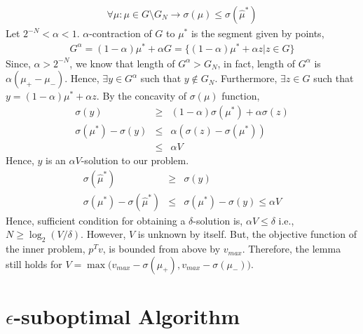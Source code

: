 \begin{eqnarray*}
\forall \mu: \mu \in G\setminus G_N \rightarrow \sigma(\mu) \leq \sigma(\hat{\mu}^*) 
\end{eqnarray*}
Let $2^{-N} < \alpha < 1$. $\alpha$-contraction of $G$ to $\mu^*$ is the segment given by points,
\begin{eqnarray*}
G^{\alpha} = (1 - \alpha)\mu^* + \alpha G = \big\{ (1-\alpha)\mu^* + \alpha z \big| z \in G \big\}
\end{eqnarray*}
Since, $\alpha > 2^{-N}$, we know that length of $G^{\alpha} > G_N$, in fact, length of $G^{\alpha}$ is $\alpha(\mu_+ - \mu_-)$. Hence, $\exists y \in G^{\alpha}$ such that $y \notin G_N$. Furthermore, $\exists z \in G$ such that $y = (1 - \alpha)\mu^* + \alpha z$. By the concavity of $\sigma(\mu)$ function,
\begin{eqnarray*}
\sigma(y) &\geq& (1 - \alpha)\sigma(\mu^*) + \alpha \sigma(z) \\
\sigma(\mu^*) - \sigma(y) &\leq& \alpha(\sigma(z) - \sigma(\mu^*)) \\
&\leq& \alpha V 
\end{eqnarray*}
Hence, $y$ is an $\alpha V$-solution to our problem.
\begin{eqnarray*}
\sigma(\hat{\mu}^*) &\geq& \sigma(y) \\
\sigma(\mu^*) - \sigma(\hat{\mu}^*) &\leq& \sigma(\mu^*) - \sigma(y) \leq \alpha V
\end{eqnarray*}
Hence, sufficient condition for obtaining a $\delta$-solution is, $\alpha V \leq \delta$ i.e., $N \geq \log_2 (V / \delta)$. However, $V$ is unknown by itself. But, the objective function of the inner problem, $p^Tv$, is bounded from above by $v_{max}$. Therefore, the lemma still holds for $V = \max\big(v_{max} - \sigma(\mu_+), v_{max} - \sigma(\mu_-)\big)$.
\section{$\epsilon$-suboptimal Algorithm}

